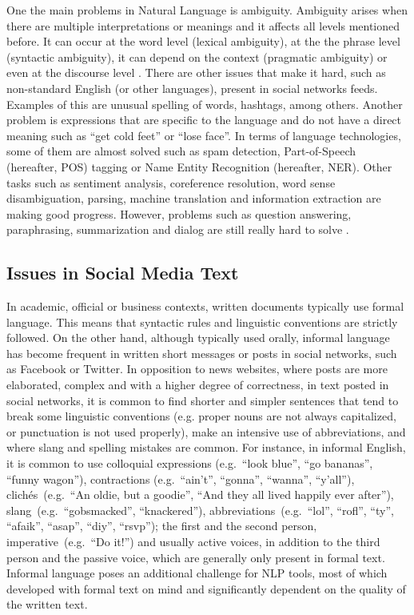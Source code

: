 One the main problems in Natural Language is ambiguity. Ambiguity arises when there are multiple interpretations or meanings and it affects all levels mentioned before. It can occur at the word level (lexical ambiguity), at the the phrase level (syntactic ambiguity), it can depend on the context (pragmatic ambiguity) or even at the discourse level \citep{Jurafsky2009SLP}. There are other issues that make it hard, such as non-standard English (or other languages), present in social networks feeds. Examples of this are unusual spelling of words, hashtags, among others. Another problem is expressions that are specific to the language and do not have a direct meaning such as ``get cold feet'' or ``lose face''.  In terms of language technologies, some of them are almost solved such as spam detection, Part-of-Speech (hereafter, POS) tagging or Name Entity Recognition (hereafter, NER). Other tasks such as sentiment analysis, coreference resolution, word sense disambiguation, parsing, machine translation and information extraction are making good progress. However, problems such as question answering, paraphrasing, summarization and dialog are still really hard to solve \citep{Jurafsky2009SLP}. 
    




\subsection{Issues in Social Media Text}

In academic, official or business contexts, written documents typically use formal language.
This means that syntactic rules and linguistic conventions are strictly followed.
On the other hand, although typically used orally, informal language has become frequent in written short messages or posts in social networks, such as Facebook or Twitter.
In opposition to news websites, where posts are more elaborated, complex and with a higher degree of correctness, in text posted in social networks, it is common to find shorter and simpler sentences that tend to break some linguistic conventions (e.g. proper nouns are not always capitalized, or punctuation is not used properly), make an intensive use of abbreviations, and where slang and spelling mistakes are common.
For instance, in informal English, it is common to use colloquial expressions (e.g.~``look blue'', ``go bananas'', ``funny wagon''), contractions (e.g.~``ain’t'', ``gonna'', ``wanna'', ``y’all''), clichés~(e.g.~``An oldie, but a goodie'', ``And they all lived happily ever after''), slang~(e.g.~``gobsmacked'', ``knackered''), abbreviations~(e.g.~``lol'', ``rofl'', ``ty'', ``afaik'', ``asap'', ``diy'', ``rsvp''); the first and the second person, imperative~(e.g.~``Do it!'') and usually active voices, in addition to the third person and the passive voice, which are generally only present in formal text.
Informal language poses an additional challenge for NLP tools, most of which developed with formal text on mind and significantly dependent on the quality of the written text.

